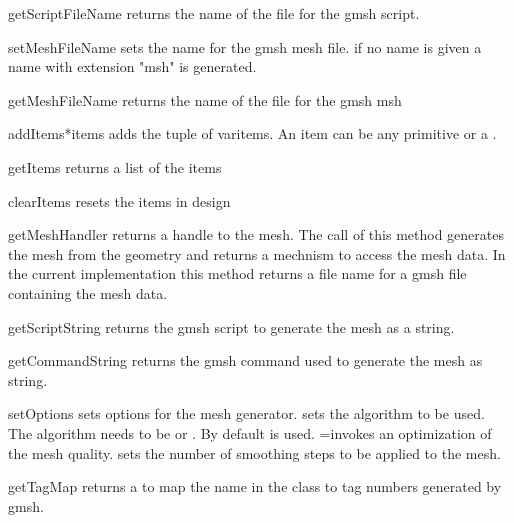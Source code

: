 \begin{methoddesc}[Design]{getScriptFileName}{}
returns the name of the file for the gmsh script.
\end{methoddesc}


\begin{methoddesc}[Design]{setMeshFileName}{}
sets the name for the gmsh  mesh file. if no name is given a name with extension "msh" is generated.
\end{methoddesc}

\begin{methoddesc}[Design]{getMeshFileName}{}
returns the name of the file for the gmsh msh
\end{methoddesc}


\begin{methoddesc}[Design]{addItems}{*items}
adds the tuple of var{items}. An item can be any primitive or a .

\end{methoddesc}

\begin{methoddesc}[Design]{getItems}{}
returns a list of the items
\end{methoddesc}

\begin{methoddesc}[Design]{clearItems}{}
resets the items in design
\end{methoddesc}

\begin{methoddesc}[Design]{getMeshHandler}{}
returns a handle to the mesh. The call of this method generates the mesh from the geometry and
returns a mechnism to access the mesh data. In the current implementation this
method returns a file name for a gmsh file containing the mesh data.
\end{methoddesc}

\begin{methoddesc}[Design]{getScriptString}{}
returns the gmsh script to generate the mesh as a string.
\end{methoddesc}

\begin{methoddesc}[Design]{getCommandString}{}
returns the gmsh command used to generate the mesh as string.
\end{methoddesc}

\begin{methoddesc}[Design]{setOptions}{}
sets options for the mesh generator.  sets the algorithm to be used.
The algorithm needs to be 
or . By default  is used. =\True invokes an optimization of the mesh quality.  sets the number of smoothing steps to be applied to the mesh.  
\end{methoddesc}

\begin{methoddesc}[Design]{getTagMap}{}
returns a  to map the name  in the class to tag numbers generated by gmsh.
\end{methoddesc}
